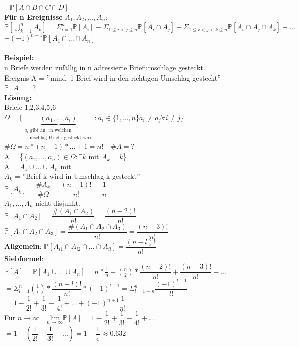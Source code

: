 	$-\mathds{P}[A\cap B \cap C \cap D]$\medskip\\
	\textbf{Für n Ereignisse} $A_1,A_2,...,A_n$:\\
	$\mathds{P}[\bigcup^n_{k=1}A_k]=\Sigma^n_{i=1}\mathds{P}[A_i]-\Sigma_{1\leq i < j \leq n}\mathds{P}[A_i\cap A_j]+\Sigma_{1\leq i < j<k\leq n} \mathds{P}[A_i\cap A_j\cap A_k]- ... $\smallskip\\
	$+ (-1)^{n+1}\mathds{P}[A_1\cap ... \cap A_n]$\\\\
	\textbf{Beispiel:}\\
n Briefe werden zufällig in n adressierte Briefumschläge gesteckt.\medskip\\
Ereignis A = ''mind. 1 Brief wird in den richtigen Umschlag gesteckt''\medskip\\
$\mathds{P}[A] = ?$\medskip\\
\textbf{Lösung:}\\
Briefe 1,2,3,4,5,6\medskip\\
$\Omega = \{\underbrace{(a_1,...,a_i)}_{\substack{a_i\text{ gibt an, in welchen}\\\text{ Umschlag Brief i gesteckt wird}}}: a_i \in \{1,...,n\} a_i \neq a_j \forall i \neq j \}$\medskip\\
\#$\Omega = n*(n-1)*...+1=n! \quad \#A = ?$\\
A = \{$(a_1,...,a_n)\in \Omega: \exists k \text{ mit } A_k = k$\}\medskip\\
A = $A_1\cup ...\cup A_n$ mit \\
$A_k$ = ''Brief k wird in Umschlag k gesteckt''\medskip\\
$\mathds{P}[A_k] = \dfrac{\#A_k}{\#\Omega}=\dfrac{(n-1)!}{n!} = \dfrac{1}{n}$\smallskip\\
$A_1,...,A_n $ nicht disjunkt.\\
$\mathds{P}[A_1\cap A_2] = \dfrac{\#(A_1 \cap A_2)}{n!} = \dfrac{(n-2)!}{n!}$\medskip\\
$\mathds{P}[A_1\cap A_2\cap A_3]=\dfrac{\#(A_1 \cap A_2 \cap A_3)}{n!} = \dfrac{(n-3)!}{n!}$\medskip\\
\textbf{Allgemein}: $ \mathds{P}[A_{i1}\cap A_{i2}\cap...\cap A_{il}]=\dfrac{(n-l)!}{n!}$\smallskip\\
\textbf{Siebformel}: $\mathds{P}[A] = \mathds{P}[A_1\cup ... \cup A_n]= n * \frac{1}{n}- \binom{n}{2}*\dfrac{(n-2)!}{n!}+\dfrac{(n-3)!}{n!}-...$\medskip\\
$= \Sigma_{l=1}^n \binom{1}{l}*\dfrac{(n-l)!}{n!}*(-1)^{l+1}= \Sigma_{l=1+n}^n\dfrac{(-1)^{l+1}}{l!}$ \medskip\\
$=1-\dfrac{1}{2!}+\dfrac{1}{3!}-\dfrac{1}{4!}+...+(-1)^{n+1}\dfrac{1}{n!}$\medskip\\
Für $n\rightarrow\infty  \quad \underset{n\rightarrow\infty}{\text{lim}}\mathds{P}[A]= 1-\dfrac{1}{2!}+\dfrac{1}{3!}-\dfrac{1}{4!}+... $\smallskip\\
$= 1- (\dfrac{1}{2!}-\dfrac{1}{3!}+...)= 1 - \dfrac{1}{e} \approx 0.632$
